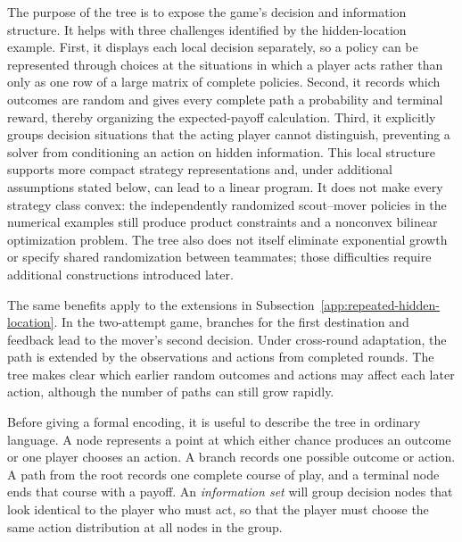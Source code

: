 The purpose of the tree is to expose the game's decision and information structure. It helps with three challenges identified by the hidden-location example. First, it displays each local decision separately, so a policy can be represented through choices at the situations in which a player acts rather than only as one row of a large matrix of complete policies. Second, it records which outcomes are random and gives every complete path a probability and terminal reward, thereby organizing the expected-payoff calculation. Third, it explicitly groups decision situations that the acting player cannot distinguish, preventing a solver from conditioning an action on hidden information. This local structure supports more compact strategy representations and, under additional assumptions stated below, can lead to a linear program. It does not make every strategy class convex: the independently randomized scout--mover policies in the numerical examples still produce product constraints and a nonconvex bilinear optimization problem. The tree also does not itself eliminate exponential growth or specify shared randomization between teammates; those difficulties require additional constructions introduced later.

The same benefits apply to the extensions in Subsection~\ref{app:repeated-hidden-location}. In the two-attempt game, branches for the first destination and feedback lead to the mover's second decision. Under cross-round adaptation, the path is extended by the observations and actions from completed rounds. The tree makes clear which earlier random outcomes and actions may affect each later action, although the number of paths can still grow rapidly.

Before giving a formal encoding, it is useful to describe the tree in ordinary language. A node represents a point at which either chance produces an outcome or one player chooses an action. A branch records one possible outcome or action. A path from the root records one complete course of play, and a terminal node ends that course with a payoff. An \emph{information set} will group decision nodes that look identical to the player who must act, so that the player must choose the same action distribution at all nodes in the group.

